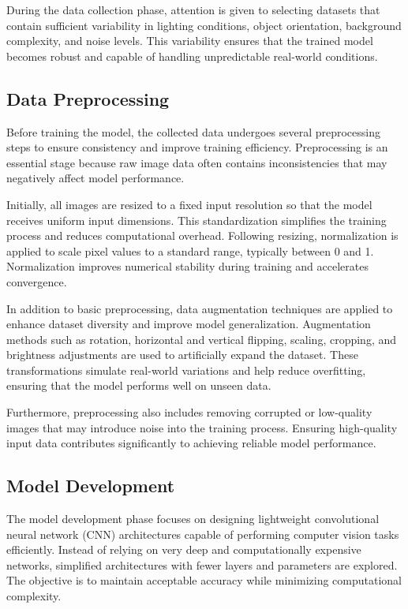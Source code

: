 \documentclass[conference]{IEEEtran}
\begin{document}
During the data collection phase, attention is given to selecting datasets that contain sufficient variability in lighting conditions, object orientation, background complexity, and noise levels. This variability ensures that the trained model becomes robust and capable of handling unpredictable real-world conditions.

\subsection{Data Preprocessing}

Before training the model, the collected data undergoes several preprocessing steps to ensure consistency and improve training efficiency. Preprocessing is an essential stage because raw image data often contains inconsistencies that may negatively affect model performance.

Initially, all images are resized to a fixed input resolution so that the model receives uniform input dimensions. This standardization simplifies the training process and reduces computational overhead. Following resizing, normalization is applied to scale pixel values to a standard range, typically between 0 and 1. Normalization improves numerical stability during training and accelerates convergence.

In addition to basic preprocessing, data augmentation techniques are applied to enhance dataset diversity and improve model generalization. Augmentation methods such as rotation, horizontal and vertical flipping, scaling, cropping, and brightness adjustments are used to artificially expand the dataset. These transformations simulate real-world variations and help reduce overfitting, ensuring that the model performs well on unseen data.

Furthermore, preprocessing also includes removing corrupted or low-quality images that may introduce noise into the training process. Ensuring high-quality input data contributes significantly to achieving reliable model performance.

\subsection{Model Development}

The model development phase focuses on designing lightweight convolutional neural network (CNN) architectures capable of performing computer vision tasks efficiently. Instead of relying on very deep and computationally expensive networks, simplified architectures with fewer layers and parameters are explored. The objective is to maintain acceptable accuracy while minimizing computational complexity.
\end{document}
